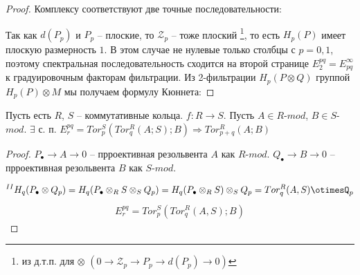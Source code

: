 \documentclass[../main.tex]{subfiles}
\begin{document}
\begin{proof}
Комплексу соответствуют две точные последовательности:
\bee
{}
\eee
Так как $d(P_p)$ и $P_p$ -- плоские, то $\mathcal{Z}_p$ -- тоже плоский \footnote{из д.т.п. для $\otimes$ $(0\to\mathcal{Z}_p \to P_p\to d(P_p)\to 0)$}, то есть $H_p(P)$ имеет плоскую размерность $1$. В этом случае не нулевые только столбцы с $p=0, 1$, поэтому спектральная последовательность сходится на второй странице $E_2^{pq} = E^{\infty}_{pq}$ к градуировочным факторам фильтрации. Из 2-фильтрации $H_p(P\otimes Q)$ группой $H_p(P)\otimes M$ мы получаем формулу Кюннета:
\bee
{}
\eee
\end{proof}
\begin{to_ex}
Пусть есть $R$, $S$ -- коммутативные кольца. $f\colon R \to S$. Пусть $A\in R$-$mod$, $B\in S$-$mod$. $\exists$ с. п. $E_r^{pq}=Tor_p^S(Tor_q^R(A; S); B) \Rightarrow Tor_{p+q}^R(A; B)$
\end{to_ex}
\begin{proof}
$P_\bullet\to A\to 0$ -- прроективная резольвента $A$ как $R$-$mod$. $Q_\bullet\to B\to 0$ -- прроективная резольвента $B$ как $S$-$mod$.
\bee\label{tens}
\eee
\begin{align*}
^{II}H_q(P_\bullet\otimes Q_p) = H_q(P_\bullet \otimes_R S \otimes_S Q_p) = H_q(P_\bullet \otimes_R S)\otimes_S Q_p = Tor_q^R(A, S)\otimesQ_p
\end{align*}
\begin{align*}
E_r^{pq} = Tor_p^S (Tor_q^R(A, S); B)
\end{align*}
\end{proof}
\end{document}
